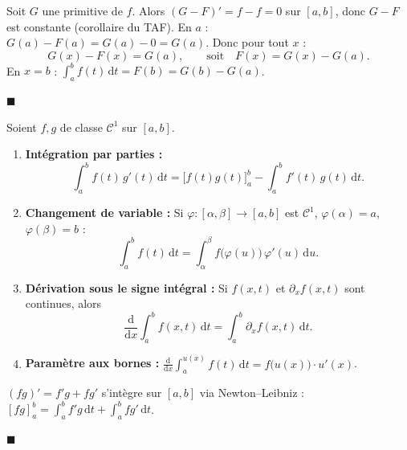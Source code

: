 
\begin{mdframed}[style=proofbar]
  Soit $G$ une primitive de $f$. Alors $(G-F)' = f - f = 0$ sur $[a,b]$,
  donc $G - F$ est constante (corollaire du TAF).
  En $a$ : $G(a) - F(a) = G(a) - 0 = G(a)$. Donc pour tout $x$ :
  \[
    G(x) - F(x) = G(a),
    \qquad\text{soit}\quad
    F(x) = G(x) - G(a).
  \]
  En $x = b$ : $\int_a^b f(t)\,\mathrm{d}t = F(b) = G(b) - G(a)$.

  \medskip\noindent$\blacksquare$
\end{mdframed}

\decsep{}


\begin{tcolorbox}[thmbox]
  Soient $f, g$ de classe $\mathcal{C}^1$ sur $[a,b]$.
  \begin{enumerate}
    \item \textbf{Intégration par parties :}
    \[
      \int_a^b f(t)\,g'(t)\,\mathrm{d}t = \bigl[f(t)g(t)\bigr]_a^b - \int_a^b f'(t)\,g(t)\,\mathrm{d}t.
    \]
    \item \textbf{Changement de variable :}
    Si $\varphi : [\alpha,\beta]\to[a,b]$ est $\mathcal{C}^1$, $\varphi(\alpha)=a$, $\varphi(\beta)=b$ :
    \[
      \int_a^b f(t)\,\mathrm{d}t = \int_\alpha^\beta f\bigl(\varphi(u)\bigr)\,\varphi'(u)\,\mathrm{d}u.
    \]
    \item \textbf{Dérivation sous le signe intégral :}
    Si $f(x,t)$ et $\partial_x f(x,t)$ sont continues, alors
    \[
      \frac{\mathrm{d}}{\mathrm{d}x}\int_a^b f(x,t)\,\mathrm{d}t = \int_a^b \partial_x f(x,t)\,\mathrm{d}t.
    \]
    \item \textbf{Paramètre aux bornes :}
    $\displaystyle\frac{\mathrm{d}}{\mathrm{d}x}\int_a^{u(x)} f(t)\,\mathrm{d}t = f\bigl(u(x)\bigr)\cdot u'(x)$.
  \end{enumerate}
\end{tcolorbox}


\begin{mdframed}[style=proofbar]
  $(fg)' = f'g + fg'$ s'intègre sur $[a,b]$ via Newton--Leibniz :
  $[fg]_a^b = \int_a^b f'g\,\mathrm{d}t + \int_a^b fg'\,\mathrm{d}t$.

  \medskip\noindent$\blacksquare$
\end{mdframed}


